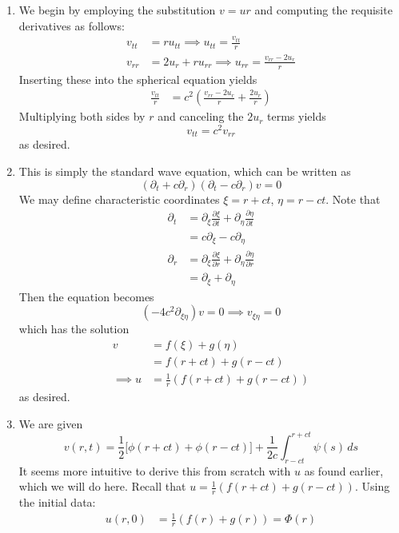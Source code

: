 \documentclass{article}
\theoremstyle{definition}
\begin{document}
\begin{enumerate}
    \item We begin by employing the substitution $v=ur$ and computing the requisite derivatives as follows:
            \begin{align*}
        v_{tt} &= ru_{tt} \implies u_{tt}=\frac{v_{tt}}{r}\\
        v_{rr} &= 2u_{r} + ru_{rr} \implies u_{rr} = \frac{v_{rr}-2u_r}{r}            
    \end{align*}
Inserting these into the spherical equation yields
\begin{align*}
    \frac{v_{tt}}{r} &= c^2\left(\frac{v_{rr}-2u_r}{r} + \frac{2u_r}{r} \right)
\end{align*}
Multiplying both sides by $r$ and canceling the $2u_r$ terms yields
$$v_{tt} = c^2v_{rr}$$
as desired.
\item This is simply the standard wave equation, which can be written as
$$(\partial_t + c\partial_r)(\partial_t - c\partial_r)v = 0$$
We may define characteristic coordinates $\xi = r+ct$, $\eta = r-ct$. Note that
\begin{align*}
    \partial_t &= \partial_{\xi}\frac{\partial \xi}{\partial t}+\partial_{\eta}\frac{\partial \eta}{\partial t}\\
    &=c\partial_{\xi}-c\partial_{\eta}\\
    \partial_r &= \partial_{\xi}\frac{\partial \xi}{\partial r}+\partial_{\eta}\frac{\partial \eta}{\partial r}\\
    &= \partial_{\xi} + \partial_{\eta}
\end{align*}
Then the equation becomes
    $$(-4c^2\partial_{\xi \eta})v = 0 \implies v_{\xi \eta} = 0$$
which has the solution
\begin{align*}
v &= f(\xi) + g(\eta)\\
    &= f(r+ct) + g(r-ct)\\
\implies u &= \frac{1}{r}(f(r+ct)+g(r-ct))
\end{align*}
as desired.
\item We are given
    \begin{equation*}
v(r,t)=\frac{1}{2}\bigl[
\phi (r+ct)+\phi (r-ct)\bigr]+\frac{1}{2c}\int_{r-ct}^{r+ct}\psi (s) \,ds
\end{equation*}
It seems more intuitive to derive this from scratch with $u$ as found earlier, which we will do here. Recall that $u = \frac{1}{r}(f(r+ct)+g(r-ct))$. Using the initial data:
\begin{align*}
    u(r,0) &= \frac{1}{r}(f(r)+g(r)) = \Phi (r)\\

\end{align*}
\end{enumerate}
\end{document}
